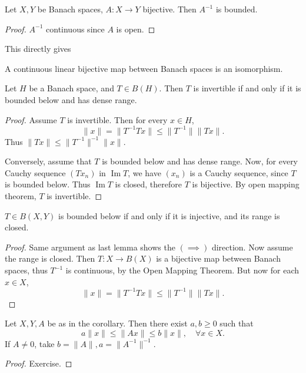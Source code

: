 \begin{corollary}
	\label{cor:BoundedInverseThm}
	Let $X, Y$ be Banach spaces, $A: X \to Y$ bijective. Then $A^{-1}$ is bounded.
\end{corollary}
\begin{proof}
	$A^{-1}$ continuous since $A$ is open.
\end{proof}

This directly gives
\begin{corollary}
	\label{cor:BanachIsomorphismThm}
	A continuous linear bijective map between Banach spaces is an isomorphism.
\end{corollary}

\begin{lemma}
	\label{lem:BoundedBelow}
	Let $H$ be a Banach space, and $T \in B(H)$. Then  $T$ is invertible if and only if it is bounded below and has dense range.
\end{lemma}
\begin{proof}
	Assume $T$ is invertible. Then for every $x \in H$,
	\[
		\|x\| = \|T^{-1} T x\| \le \|T^{-1}\| \|T x\|
	.\] 
	Thus $\|T x\| \le \|T^{-1}\|^{-1} \|x\|$.

	Conversely, assume that $T$ is bounded below and has dense range. Now, for every Cauchy sequence $(T x_n)$ in $\operatorname{Im} T$, we have $(x_n)$ is a Cauchy sequence, since $T$ is bounded below. Thus $\operatorname{Im} T$ is closed, therefore $T$ is bijective. By open mapping theorem, $T$ is invertible.
\end{proof}

\begin{lemma}
	\label{lem:BoundedBelowInjectiveRangeClosed}
	$T \in  B(X, Y)$ is bounded below if and only if it is injective, and its range is closed.
\end{lemma}
\begin{proof}
	Same argument as last lemma shows the $(\implies)$ direction. Now assume the range is closed. Then $T: X \to B\left(X \right) $ is a bijective map between Banach spaces, thus $T^{-1}$ is continuous, by the Open Mapping Theorem. But now for each $x \in X$,
	\[
		\|x\| = \|T^{-1} T x\| \le \|T^{-1}\| \|T x\|
	.\] 
\end{proof}






\begin{remark}
	Let $X, Y, A$ be as in the corollary. Then there exist $a, b \ge 0$ such that
	\[
		a \|x\| \le  \|A x\| \le  b \|x\|, \quad \forall x \in X
	.\] 
	If $A \neq 0$, take $b = \|A\|, a = \|A^{-1}\|^{-1}$.
\end{remark}
\begin{proof}
	Exercise. 
\end{proof}

